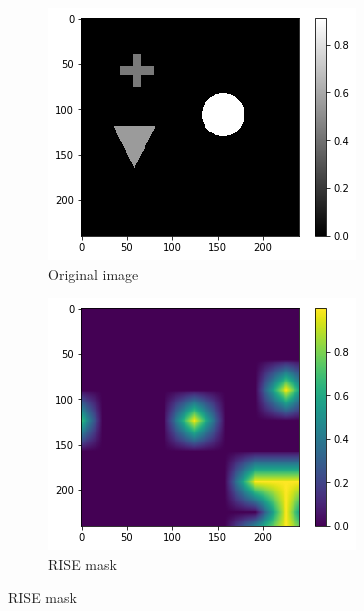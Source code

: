 \begin{figure}[H]
    \centering
    \begin{subfigure}[t]{.32\textwidth}
        \centering
        \includegraphics[width=\linewidth]{chapters/02_methods/images/rise/rise_original.png}
        \caption{Original image}
    \end{subfigure}\hfill%
    \begin{subfigure}[t]{.32\textwidth}
        \centering
        \includegraphics[width=\linewidth]{chapters/02_methods/images/rise/rise1_mask.png}
        \caption{RISE mask}

\end{subfigure}
\end{figure}
